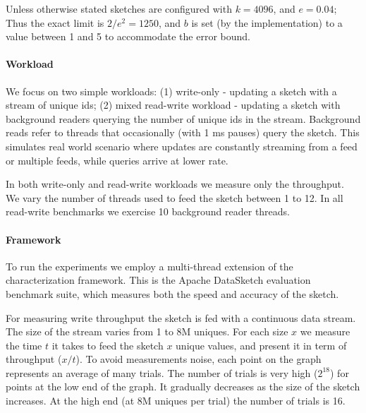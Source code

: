 Unless otherwise stated sketches are configured with $k = 4096$, and $e=0.04$; Thus the exact limit is $2/e^2=1250$, and $b$ is set (by the implementation) to a value between 1 and 5 to accommodate the error bound.


\paragraph{Workload}
We focus on two simple workloads: (1) write-only  - updating a sketch with a stream of unique ids; (2) mixed read-write workload - updating
a sketch with background readers querying the number of unique ids in the stream. Background reads refer to threads that occasionally
(with 1 ms pauses) query the sketch. This simulates real world scenario where updates are constantly streaming from a feed or multiple
feeds, while queries arrive at lower rate.

In both write-only and read-write workloads we measure only the throughput. We vary the number of threads used to feed
the sketch between 1 to 12. In all read-write benchmarks we exercise 10 background reader threads.
\paragraph{Framework}
To run the experiments we employ a multi-thread extension of the characterization framework. This is the Apache DataSketch evaluation benchmark suite, which measures both the speed and accuracy of the sketch. 

For measuring write throughput the sketch is fed with a continuous data stream. The size of the stream varies from 1 to 8M uniques. For each size $x$ we measure the time $t$ it takes to feed the sketch $x$ unique values, and present it in term of throughput ($x/t$). To avoid measurements noise, each point on the graph represents an average of many trials. The number of trials is very high ($2^{18}$) for points at the low end of the graph. It gradually decreases as the size of the sketch increases. At the high end (at 8M uniques per trial) the number of trials is 16. 

